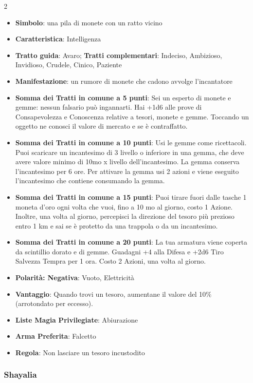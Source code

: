 \begin{multicols}{2}
\begin{itemize}[leftmargin=*] \setlength{\itemsep}{0pt}
\item \textbf{Simbolo}: una pila di monete con un ratto vicino
\item \textbf{Caratteristica}: Intelligenza
\item \textbf{Tratto guida}: Avaro; \textbf{Tratti complementari}: Indeciso, Ambizioso, Invidioso, Crudele, Cinico, Paziente
\item \textbf{Manifestazione}: un rumore di monete che cadono avvolge l'incantatore
\item \textbf{Somma dei Tratti in comune a 5 punti}: Sei un esperto di monete e gemme: nessun falsario può ingannarti. Hai +1d6 alle prove di Consapevolezza e Conoscenza relative a tesori, monete e gemme. Toccando un oggetto ne conosci il valore di mercato e se è contraffatto.
\item \textbf{Somma dei Tratti in comune a 10 punti}: Usi le gemme come ricettacoli. Puoi scaricare un incantesimo di 3 livello o inferiore in una gemma, che deve avere valore minimo di 10mo x livello dell'incantesimo. La gemma conserva l'incantesimo per 6 ore. Per attivare la gemma usi 2 azioni e viene eseguito l'incantesimo che contiene consumando la gemma.
\item \textbf{Somma dei Tratti in comune a 15 punti}: Puoi tirare fuori dalle tasche 1 moneta d'oro ogni volta che vuoi, fino a 10 mo al giorno, costo 1 Azione. Inoltre, una volta al giorno, percepisci la direzione del tesoro più prezioso entro 1 km e sai se è protetto da una trappola o da un incantesimo.
\item \textbf{Somma dei Tratti in comune a 20 punti}: La tua armatura viene coperta da scintillio dorato e di gemme. Guadagni +4 alla Difesa e +2d6 Tiro Salvezza Tempra per 1 ora. Costo 2 Azioni, una volta al giorno.
\item \textbf{Polarità: Negativa}: Vuoto, Elettricità
\item \textbf{Vantaggio}: Quando trovi un tesoro, aumentane il valore del 10\% (arrotondato per eccesso).
\item \textbf{Liste Magia Privilegiate}: Abiurazione
\item \textbf{Arma Preferita}: Falcetto
\item \textbf{Regola}: Non lasciare un tesoro incustodito
\end{itemize}

\subsubsection{Shayalia}\label{shayalia}\hypertarget{shayalia}{}


\end{multicols}
